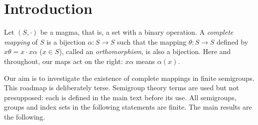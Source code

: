\documentclass[11pt]{article}
\theoremstyle{plain}
\theoremstyle{remark}
\theoremstyle{definition}
\theoremstyle{plain}
\begin{document}
\section{Introduction}

Let $(S,\cdot)$ be a magma, that is, a set with a binary operation. A \emph{complete mapping} of $S$ is a bijection $\alpha\colon S\to S$ such that the mapping $\theta\colon S\to S$ defined by $x\theta = x\cdot x\alpha$ ($x\in S$), called an \emph{orthomorphism}, is also a bijection.
Here and throughout, our maps act on the right: $x\alpha$ means $\alpha(x)$.%

\begingroup
Our aim is to investigate the existence of complete mappings in finite
semigroups. This roadmap is deliberately terse. Semigroup theory terms are used but not presupposed: each is defined in the main text before its use.
All semigroups, groups and index sets in the following statements are finite.
The main results are the following.
\end{document}
